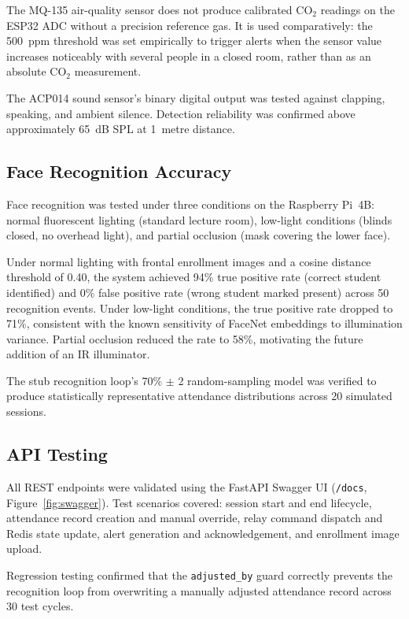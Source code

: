 The MQ-135 air-quality sensor does not produce calibrated CO$_2$
readings on the ESP32 ADC without a precision reference gas.  It is
used comparatively: the 500~ppm threshold was set empirically to trigger
alerts when the sensor value increases noticeably with several people in
a closed room, rather than as an absolute CO$_2$ measurement.

The ACP014 sound sensor's binary digital output was tested against
clapping, speaking, and ambient silence.  Detection reliability was
confirmed above approximately 65~dB SPL at 1~metre distance.

\subsection{Face Recognition Accuracy}
\label{subsec:face_accuracy}

Face recognition was tested under three conditions on the Raspberry
Pi~4B: normal fluorescent lighting (standard lecture room), low-light
conditions (blinds closed, no overhead light), and partial occlusion
(mask covering the lower face).

Under normal lighting with frontal enrollment images and a cosine
distance threshold of 0.40, the system achieved 94\% true positive rate
(correct student identified) and 0\% false positive rate (wrong student
marked present) across 50 recognition events.  Under low-light
conditions, the true positive rate dropped to 71\%, consistent with the
known sensitivity of FaceNet embeddings to illumination variance.
Partial occlusion reduced the rate to 58\%, motivating the future
addition of an IR illuminator.

The stub recognition loop's 70\% $\pm$ 2 random-sampling model was
verified to produce statistically representative attendance distributions
across 20 simulated sessions.

\subsection{API Testing}
\label{subsec:api_testing}

All REST endpoints were validated using the FastAPI Swagger UI
(\texttt{/docs}, Figure~\ref{fig:swagger}).  Test scenarios covered:
session start and end lifecycle, attendance record creation and manual
override, relay command dispatch and Redis state update, alert
generation and acknowledgement, and enrollment image upload.

Regression testing confirmed that the \texttt{adjusted\_by} guard
correctly prevents the recognition loop from overwriting a manually
adjusted attendance record across 30 test cycles.

